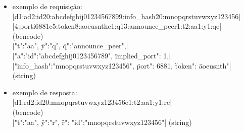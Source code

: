 
\begin{itemize}
    \item exemplo de requisição: \\
        \bverb|d1:ad2:id20:abcdefghij01234567899:info_hash20:mnopqrstuvwxyz123456| \\
        \bverb|4:porti6881e5:token8:aoeusnthe1:q13:announce_peer1:t2:aa1:y1:qe| \\
        (\gls*{bencode}) \\
        \sverb|{"t":"aa", \"y":"q", \"q":"announce_peer",| \\
        \sverb|"a":{"id":"abcdefghij0123456789", \"implied_port": 1,| \\
        \sverb|"info_hash":"mnopqrstuvwxyz123456", \"port": 6881, \"token": \"aoeusnth"}}|
        (\gls*{string})

    \item exemplo de resposta: \\
        \bverb|d1:rd2:id20:mnopqrstuvwxyz123456e1:t2:aa1:y1:re| \\
        (\gls*{bencode}) \\
        \sverb|{"t":"aa", \"y":"r", \"r": {"id":"mnopqrstuvwxyz123456"}}|
        (\gls*{string})
\end{itemize}